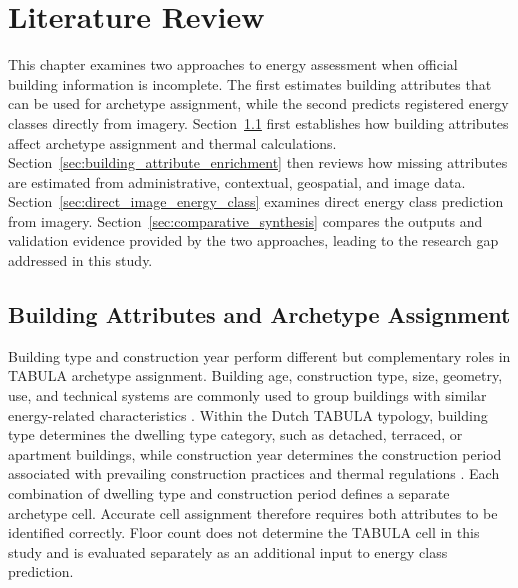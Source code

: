 \chapter{Literature Review}
\label{ch:literature_review}

This chapter examines two approaches to energy assessment when official building information is incomplete. The first estimates building attributes that can be used for archetype assignment, while the second predicts registered energy classes directly from imagery. Section~\ref{sec:building_attributes_archetype_assignment} first establishes how building attributes affect archetype assignment and thermal calculations. Section~\ref{sec:building_attribute_enrichment} then reviews how missing attributes are estimated from administrative, contextual, geospatial, and image data. Section~\ref{sec:direct_image_energy_class} examines direct energy class prediction from imagery. Section~\ref{sec:comparative_synthesis} compares the outputs and validation evidence provided by the two approaches, leading to the research gap addressed in this study.

\section{Building Attributes and Archetype Assignment}
\label{sec:building_attributes_archetype_assignment}

Building type and construction year perform different but complementary roles in \ac{TABULA} archetype assignment. Building age, construction type, size, geometry, use, and technical systems are commonly used to group buildings with similar energy-related characteristics \parencite{reinhart2016,shen_archetype_2024}. Within the Dutch \ac{TABULA} typology, building type determines the dwelling type category, such as detached, terraced, or apartment buildings, while construction year determines the construction period associated with prevailing construction practices and thermal regulations \parencite{loga2016,rvo2011}. Each combination of dwelling type and construction period defines a separate archetype cell. Accurate cell assignment therefore requires both attributes to be identified correctly. Floor count does not determine the \ac{TABULA} cell in this study and is evaluated separately as an additional input to energy class prediction.

